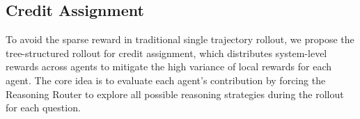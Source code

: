 
\subsection{Credit Assignment}\label{sec:tree_credit}
To avoid the sparse reward in traditional single trajectory rollout, we propose the tree-structured rollout for credit assignment, which distributes system-level rewards across agents to mitigate the high variance of local rewards for each agent.
The core idea is to evaluate each agent's contribution by forcing the Reasoning Router to explore all possible reasoning strategies during the rollout for each question.

